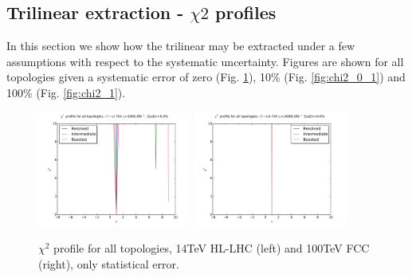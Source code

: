 \documentclass[11pt]{article}
\begin{document}
\newpage
\subsection{Trilinear extraction - $\chi2$ profiles}

In this section we show how the trilinear may be extracted under a few assumptions with respect to the systematic uncertainty. Figures are shown for all topologies given a systematic error of zero (Fig. \ref{fig:chi2_0}), 10\% (Fig. \ref{fig:chi2_0_1}) and 100\% (Fig. \ref{fig:chi2_1}).

\begin{figure}[htbp]
\begin{center}
\includegraphics[width=0.45\textwidth]{plots/chi2_14TeV_sys0_0.pdf}
\includegraphics[width=0.45\textwidth]{plots/chi2_100TeV_sys0_0.pdf}
\caption{$\chi^2$ profile for all topologies, 14TeV HL-LHC (left) and 100TeV FCC (right), only statistical error.}
\label{fig:chi2_0}
\end{center}
\end{figure}
\end{document}
